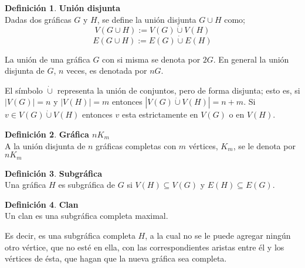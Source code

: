 \documentclass[11pt]{book}
\theoremstyle{definition}
\newtheorem{definition}{Definición}
\begin{document}
\begin{definition}\textbf{Unión disjunta}\\
  Dadas dos gráficas $G$ y $H$, se define la unión disjunta $G\cup H$
  como;
$$V(G\cup H):=V(G)\dot{\cup}V(H)$$ $$E(G\cup H):=E(G)\dot{\cup}E(H)$$
\end{definition}

La unión de una gráfica $G$ con si misma se denota por $2G$. En general la unión
disjunta de $G$, $n$ veces, es denotada por $nG$. 

El símbolo $\dot{\cup}$ representa la unión de conjuntos, pero de
forma disjunta; esto es, si $|V(G)|=n$ y $|V(H)|=m$ entonces
$|V(G)\dot{\cup}V(H)|= n + m$. Si $v \in V(G)\dot{\cup}V(H)$ entonces
$v$ esta estrictamente en $V(G)$ o en $V(H)$.


\begin{definition}\textbf{Gráfica $nK_m$}\\
  A la unión disjunta de $n$ gráficas completas con $m$ vértices, $K_m$, se le denota por $nK_m$
\end{definition}


\begin{definition}\textbf{Subgráfica}\\
  Una gráfica $H$ es subgráfica de $G$ si $V(H)\subseteq V(G)$ y
  $E(H)\subseteq E(G)$.
\end{definition}


\begin{definition}\textbf{Clan}\\
  Un clan es una subgráfica completa maximal.
\end{definition}

Es decir, es una subgráfica completa $H$, a la cual no se le puede
agregar ningún otro vértice, que no esté en ella, con las
correspondientes aristas entre \'el y los vértices de \'esta, que
hagan que la nueva gráfica sea completa.
\end{document}
